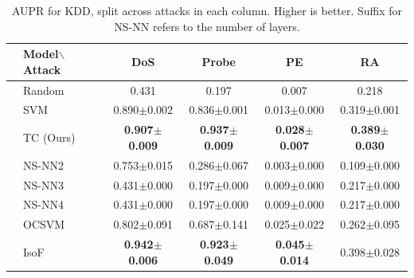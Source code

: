 \documentclass{article}
\begin{document}
\begin{table}[]
    \centering
    \caption{AUPR for KDD, split across attacks in each column. 
    Higher is better.
    Suffix for NS-NN refers to the number of layers.
    }
    \begin{tabular}{cl|cccc}
        \toprule
        &Model$\backslash$Attack & DoS & Probe & PE & RA \\%
         \midrule
        &Random & 0.431 & 0.197 & 0.007 & 0.218 \\%
        \midrule
        \parbox[t]{2mm}{} & SVM & 0.890$\pm$0.002 & 0.836$\pm$0.001 & 0.013$\pm$0.000 & 0.319$\pm$0.001 \\
        &TC (Ours) & \bf{0.907$\pm$0.009} & \bf{0.937$\pm$0.009} & \bf{0.028$\pm$0.007} & \bf{0.389$\pm$0.030} \\
        &NS-NN2 & 0.753$\pm$0.015 & 0.286$\pm$0.067 & 0.003$\pm$0.000 & 0.109$\pm$0.000 \\
        &NS-NN3 & 0.431$\pm$0.000 & 0.197$\pm$0.000 & 0.009$\pm$0.000 & 0.217$\pm$0.000 \\
        &NS-NN4 & 0.431$\pm$0.000 & 0.197$\pm$0.000 & 0.009$\pm$0.000 & 0.217$\pm$0.000 \\%
        \midrule
        \parbox[t]{2mm}{}&OCSVM & 0.802$\pm$0.091 & 0.687$\pm$0.141 & 0.025$\pm$0.022 & 0.262$\pm$0.095 \\
        &IsoF & \textbf{0.942$\pm$0.006} & \textbf{0.923$\pm$0.049} & \textbf{0.045$\pm$0.014} & 0.398$\pm$0.028 \\

\end{tabular}
\end{table}
\end{document}
